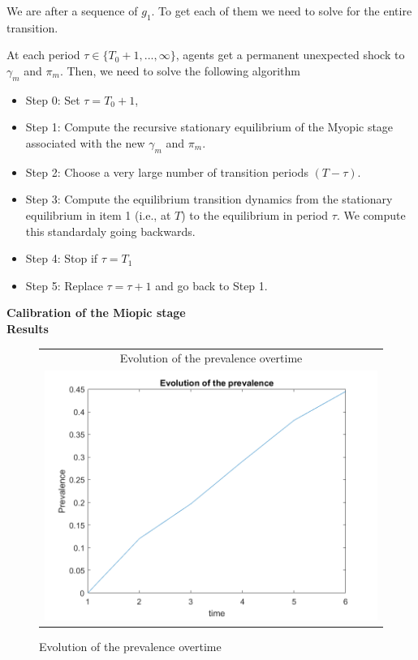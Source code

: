 We are after a sequence of $g_1$. To get each of them we need to solve for the entire transition.

At each period $\tau \in \{T_0+1,..., \infty\}$, agents get a permanent unexpected shock to $\gamma_m$ and $\pi_m$. Then, we need to solve the following algorithm %

\begin{itemize}
\item Step 0: Set $\tau=T_0+1$,
\item Step 1: Compute the recursive stationary equilibrium of the Myopic stage associated with the new $\gamma_m$ and $\pi_m$.
\item Step 2: Choose a very large number of transition  periods $(T-\tau)$.
\item Step 3: Compute the equilibrium transition dynamics from the stationary equilibrium in item 1 (i.e., at $T$) to the  equilibrium in period $\tau$. We compute this standardaly going backwards.
\item Step 4: Stop if $\tau=T_1$
\item Step 5: Replace $\tau=\tau+1$ and go back to Step 1.
\end{itemize}




\textbf{Calibration of  the Miopic stage}\\

\textbf{Results}\\

\begin{figure}[H]
\caption{Evolution of the prevalence overtime}
\hspace{-2.0cm}
\begin{center}
\begin{tabular}{c}
\multicolumn{1}{c}{Evolution of the prevalence overtime} \\
\includegraphics[angle=0,width=.5\textwidth]{figures/PREV.png}
\end{tabular}
\end{center}
\label{fig:6}
\end{figure}
\newpage


